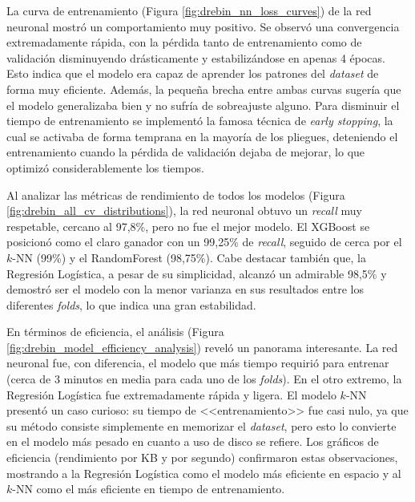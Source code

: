 
La curva de entrenamiento (Figura \ref{fig:drebin_nn_loss_curves}) de la red neuronal mostró un comportamiento muy positivo. Se observó una convergencia extremadamente rápida, con la pérdida tanto de entrenamiento como de validación disminuyendo drásticamente y estabilizándose en apenas 4 épocas. Esto indica que el modelo era capaz de aprender los patrones del \textit{dataset} de forma muy eficiente. Además, la pequeña brecha entre ambas curvas sugería que el modelo generalizaba bien y no sufría de sobreajuste alguno. Para disminuir el tiempo de entrenamiento se implementó la famosa técnica de \textit{early stopping}, la cual se activaba de forma temprana en la mayoría de los pliegues, deteniendo el entrenamiento cuando la pérdida de validación dejaba de mejorar, lo que optimizó considerablemente los tiempos.


Al analizar las métricas de rendimiento de todos los modelos (Figura \ref{fig:drebin_all_cv_distributions}), la red neuronal obtuvo un \textit{recall} muy respetable, cercano al 97,8\%, pero no fue el mejor modelo. El XGBoost se posicionó como el claro ganador con un 99,25\% de \textit{recall}, seguido de cerca por el $k$-NN (99\%) y el RandomForest (98,75\%). Cabe destacar también que, la Regresión Logística, a pesar de su simplicidad, alcanzó un admirable 98,5\% y demostró ser el modelo con la menor varianza en sus resultados entre los diferentes \textit{folds}, lo que indica una gran estabilidad.


En términos de eficiencia, el análisis (Figura \ref{fig:drebin_model_efficiency_analysis}) reveló un panorama interesante. La red neuronal fue, con diferencia, el modelo que más tiempo requirió para entrenar (cerca de 3 minutos en media para cada uno de los \textit{folds}). En el otro extremo, la Regresión Logística fue extremadamente rápida y ligera. El modelo $k$-NN presentó un caso curioso: su tiempo de <<entrenamiento>> fue casi nulo, ya que su método consiste simplemente en memorizar el \textit{dataset}, pero esto lo convierte en el modelo más pesado en cuanto a uso de disco se refiere. Los gráficos de eficiencia (rendimiento por KB y por segundo) confirmaron estas observaciones, mostrando a la Regresión Logística como el modelo más eficiente en espacio y al $k$-NN como el más eficiente en tiempo de entrenamiento.

